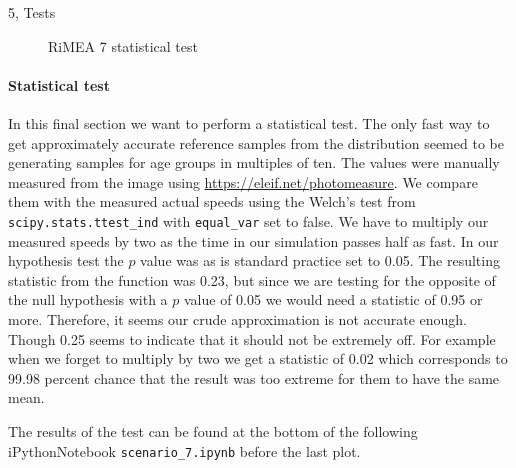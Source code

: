 \begin{task}{5, Tests}
\begin{figure}[H]
\caption{RiMEA 7 statistical test}
\label{rimea7stats}
\end{figure}

\paragraph{Statistical test}
In this final section we want to perform a statistical test. The only fast way to get approximately accurate reference samples from the distribution seemed to be generating samples for age groups in multiples of ten. The values were manually measured from the image using \url{https://eleif.net/photomeasure}. We compare them with the measured actual speeds using the Welch's test from \verb+scipy.stats.ttest_ind+ with \verb+equal_var+ set to false. We have to multiply our measured speeds by two as the time in our simulation passes half as fast.
In our hypothesis test the $p$ value was as is standard practice set to 0.05. The resulting statistic from the function was 0.23, but since we are testing for the opposite of the null hypothesis with a $p$ value of 0.05 we would need a statistic of 0.95 or more. Therefore, it seems our crude approximation is not accurate enough. Though 0.25 seems to indicate that it should not be extremely off. For example when we forget to multiply by two we get a statistic of 0.02 which corresponds to 99.98 percent chance that the result was too extreme for them to have the same mean.

The results of the test can be found at the bottom of the following iPythonNotebook \texttt{scenario\_7.ipynb} before the last plot.

\end{task}